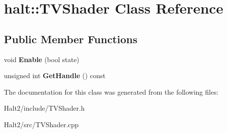 \hypertarget{classhalt_1_1_t_v_shader}{\section{halt\-:\-:\-T\-V\-Shader \-Class \-Reference}
\label{classhalt_1_1_t_v_shader}
}
\subsection*{\-Public \-Member \-Functions}
\begin{DoxyCompactItemize}
\item 
\hypertarget{classhalt_1_1_t_v_shader_a00500bcee03993f0ba58ac4cdf58da61}{void {\bfseries \-Enable} (bool state)}\label{classhalt_1_1_t_v_shader_a00500bcee03993f0ba58ac4cdf58da61}

\item 
\hypertarget{classhalt_1_1_t_v_shader_a7dc79247f93cc75ef7e12a14ec9809eb}{unsigned int {\bfseries \-Get\-Handle} () const }\label{classhalt_1_1_t_v_shader_a7dc79247f93cc75ef7e12a14ec9809eb}

\end{DoxyCompactItemize}


\-The documentation for this class was generated from the following files\-:\begin{DoxyCompactItemize}
\item 
\-Halt2/include/\-T\-V\-Shader.\-h\item 
\-Halt2/src/\-T\-V\-Shader.\-cpp\end{DoxyCompactItemize}
